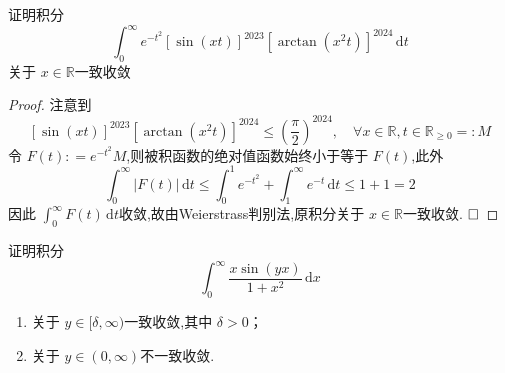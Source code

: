\documentclass[lang=cn,12pt,color=green,fontset=none,thmcnt=section]{elegantbook}
\begin{document}
\begin{exercise}
    证明积分 $$
    \int_{0}^{\infty} e^{-t^{2}} [\sin \left( xt \right) ]^{2023}[\arctan \left( x^{2}t \right) ]^{2024}\,\mathrm{d} t
    $$关于 $ x \in \mathbb{R}  $一致收敛 
\end{exercise}

\begin{proof}
    注意到$$
    [\sin \left( xt \right) ]^{2023}[\arctan \left( x^{2}t \right) ]^{2024}\le  \left( \frac{\pi}{2} \right)^{2024},\quad \forall x \in \mathbb{R} ,t \in \mathbb{R} _{\ge 0} = :M
    $$
    令 $ F\left( t \right): = e^{-t^{2}}M  $,则被积函数的绝对值函数始终小于等于 $ F\left( t \right)  $,此外 $$
    \int_{0}^{\infty}\left| F\left( t \right)  \right| \,\mathrm{d} t \le  \int_{0}^{1}e^{-t^{2}}+  \int_{1}^{\infty}e^{-t}\,\mathrm{d} t \le 1+  1 = 2
    $$ 因此 $ \int_{0}^{\infty}F\left( t \right)\,\mathrm{d} t  $收敛,故由Weierstrass判别法,原积分关于 $ x \in \mathbb{R}  $一致收敛.  
    $\hfill\square$
\end{proof}

\begin{exercise}
    证明积分 $$
    \int_{0}^{\infty} \frac{x \sin \left( yx \right)  }{1+ x^{2} } \,\mathrm{d} x 
    $$
    \begin{enumerate}
        \item 关于 $ y\in [ \delta ,\infty) $一致收敛,其中 $  \delta >0 $；
        \item 关于 $ y \in \left( 0,\infty \right)  $不一致收敛.   
    \end{enumerate}
    
\end{exercise}
\end{document}

